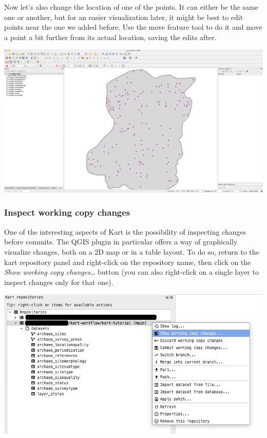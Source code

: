 \documentclass[
  letterpaper,
  DIV=11,
  numbers=noendperiod]{scrartcl}
\begin{document}
Now let's also change the location of one of the points. It can either
be the same one or another, but for an easier visualization later, it
might be best to edit points near the one we added before. Use the move
feature tool to do it and move a point a bit further from its actual
location, saving the edits after.

\begin{center}
\includegraphics{img/qgis-move-feature.png}
\end{center}

\subsubsection{Inspect working copy
changes}\label{inspect-working-copy-changes}

One of the interesting aspects of Kart is the possibility of inspecting
changes before commits. The QGIS plugin in particular offers a way of
graphically visualize changes, both on a 2D map or in a table layout. To
do so, return to the kart repository panel and right-click on the
repository name, then click on the \emph{Show working copy
changes\ldots{}} button (you can also right-click on a single layer to
inspect changes only for that one).

\begin{center}
\includegraphics{img/kart-panel-show-wc-changes.png}
\end{center}
\end{document}
